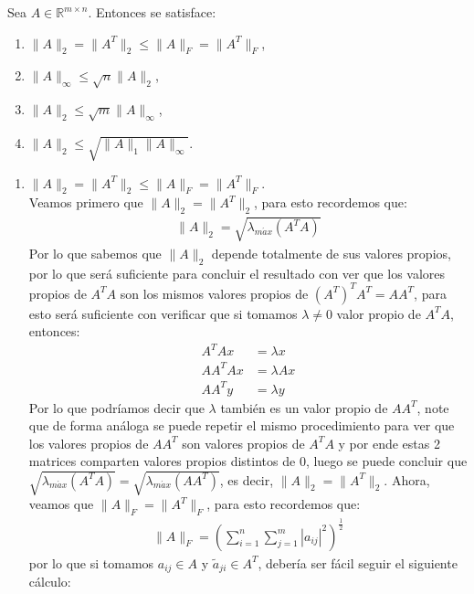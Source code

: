\begin{homeworkProblem}
  Sea $A\in \mathbb{R}^{m\times n}$. Entonces se satisface:
  \begin{enumerate}
    \item $\|A\|_2=\|A^{T}\|_{2}\leq \|A\|_{F}=\|A^{T}\|_{F}$,
    \item $\|A\|_{\infty}\leq \sqrt{n}\|A\|_{2}$,
    \item $\|A\|_{2}\leq \sqrt{m}\|A\|_{\infty}$,
    \item $\|A\|_{2}\leq \sqrt{\|A\|_{1}\|A\|_{\infty}}$.
  \end{enumerate}
  \begin{solucion}
    \begin{enumerate}
      \item $\|A\|_2=\|A^{T}\|_{2}\leq \|A\|_{F}=\|A^{T}\|_{F}$.\\
        Veamos primero que $\|A\|_{2}=\|A^{T}\|_{2}$, para esto recordemos que:
        \begin{align*}
          \|A\|_{2}=\sqrt{\lambda_{m\acute{a}x}(A^TA)}
        \end{align*}
        Por lo que sabemos que $\|A\|_{2}$ depende totalmente de sus valores propios, por lo que será suficiente para concluir el resultado con ver que los valores propios de $A^{T}A$ son los mismos valores propios de $(A^{T})^{T}A^{T}=AA^{T}$, para esto será suficiente con verificar que si tomamos $\lambda\neq 0$ valor propio de $A^TA$, entonces:
        \begin{align*}
          A^TAx&=\lambda x\\
          AA^TAx&=\lambda Ax\\
          AA^Ty&=\lambda y
        \end{align*}
        Por lo que podríamos decir que $\lambda$ también es un valor propio de $AA^T$, note que de forma análoga se puede repetir el mismo procedimiento para ver que los valores propios de $AA^T$ son valores propios de $A^TA$ y por ende estas 2 matrices comparten valores propios distintos de $0$, luego se puede concluir que $\sqrt{\lambda_{m\acute{a}x}(A^TA)}=\sqrt{\lambda_{m\acute{a}x}(AA^T)}$, es decir, $\|A\|_2=\|A^T\|_{2}$.
        Ahora, veamos que $\|A\|_{F}=\|A^T\|_{F}$, para esto recordemos que:
        \begin{align*}
          \|A\|_{F}=\left( \sum_{i=1}^n \sum_{j=1}^{m}|a_{ij}|^2 \right)^{\frac{1}{2}}
        \end{align*}
        por lo que si tomamos $a_{ij}\in A$ y $\tilde{a}_{ji}\in A^T$, debería ser fácil seguir el siguiente cálculo:

\end{enumerate}
\end{solucion}
\end{homeworkProblem}
